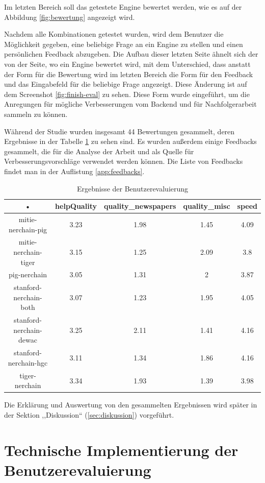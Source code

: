 Im letzten Bereich soll das getestete Engine bewertet werden, wie es auf der Abbildung \ref{fig:bewertung} angezeigt wird.

Nachdem alle Kombinationen getestet wurden, wird dem Benutzer die Möglichkeit gegeben, eine beliebige Frage an ein Engine zu stellen und einen persönlichen Feedback abzugeben. Die Aufbau dieser letzten Seite ähnelt sich der von der Seite, wo ein Engine bewertet wird, mit dem Unterschied, dass anstatt der Form für die Bewertung wird im letzten Bereich die Form für den Feedback und das Eingabefeld für die beliebige Frage angezeigt. Diese Änderung ist auf dem Screenshot \ref{fig:finish-eval} zu sehen. Diese Form wurde eingeführt, um die Anregungen für mögliche Verbesserungen vom Backend und für Nachfolgerarbeit sammeln zu können.

Während der Studie wurden insgesamt 44 Bewertungen gesammelt, deren Ergebnisse in der Tabelle \ref{app:RESULTS} zu sehen sind. Es wurden außerdem einige Feedbacks gesammelt, die für die Analyse der Arbeit und als Quelle für Verbesserungsvorschläge verwendet werden können. Die Liste von Feedbacks findet man in der Auflistung \ref{app:feedbacks}.

\begin{table}
\begin{tabular}{|c|c|c|c|c|}
\hline 
• & helpQuality & quality\_newspapers & quality\_misc & speed \\ 
\hline 
mitie-nerchain-pig & 3.23 & 1.98 & 1.45 & 4.09 \\ 
\hline 
mitie-nerchain-tiger & 3.15 & 1.25 & 2.09 & 3.8 \\ 
\hline 
pig-nerchain & 3.05 & 1.31 & 2 & 3.87 \\ 
\hline 
stanford-nerchain-both & 3.07 & 1.23 & 1.95 & 4.05 \\ 
\hline 
stanford-nerchain-dewac & 3.25 & 2.11 & 1.41 & 4.16 \\ 
\hline 
stanford-nerchain-hgc & 3.11 & 1.34 & 1.86 & 4.16 \\ 
\hline 
tiger-nerchain & 3.34 & 1.93 & 1.39 & 3.98 \\ 
\hline 
\end{tabular} 
\caption{Ergebnisse der Benutzerevaluierung}
\label{app:RESULTS}
\end{table}

Die Erklärung und Auswertung von den gesammelten Ergebnissen wird später in der Sektion ,,Diskussion`` (\ref{sec:diskussion}) vorgeführt. 

\section{Technische Implementierung der Benutzerevaluierung}
